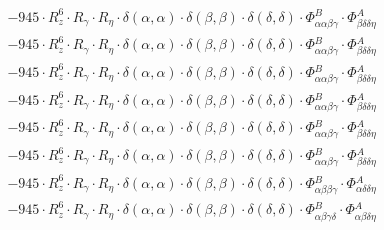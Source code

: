\documentclass{article}
\begin{document}
\begin{subequations}
\begin{gather}
\begin{array}{c}
 \\[0.2em] 		 - 945 \cdot R_{z}^{6} \cdot R_{\gamma{}} \cdot R_{\eta{}} \cdot \delta{}\left(\alpha{}, \alpha{}\right) \cdot \delta{}\left(\beta{}, \beta{}\right) \cdot \delta{}\left(\delta{}, \delta{}\right) \cdot \Phi{}^{B}_{\alpha{}\alpha{}\beta{}\gamma{}} \cdot \Phi{}^{A}_{\beta{}\delta{}\delta{}\eta{}} 
 \\[0.2em] 		 - 945 \cdot R_{z}^{6} \cdot R_{\gamma{}} \cdot R_{\eta{}} \cdot \delta{}\left(\alpha{}, \alpha{}\right) \cdot \delta{}\left(\beta{}, \beta{}\right) \cdot \delta{}\left(\delta{}, \delta{}\right) \cdot \Phi{}^{B}_{\alpha{}\alpha{}\beta{}\gamma{}} \cdot \Phi{}^{A}_{\beta{}\delta{}\delta{}\eta{}} 
 \\[0.2em] 		 - 945 \cdot R_{z}^{6} \cdot R_{\gamma{}} \cdot R_{\eta{}} \cdot \delta{}\left(\alpha{}, \alpha{}\right) \cdot \delta{}\left(\beta{}, \beta{}\right) \cdot \delta{}\left(\delta{}, \delta{}\right) \cdot \Phi{}^{B}_{\alpha{}\alpha{}\beta{}\gamma{}} \cdot \Phi{}^{A}_{\beta{}\delta{}\delta{}\eta{}} 
 \\[0.2em] 		 - 945 \cdot R_{z}^{6} \cdot R_{\gamma{}} \cdot R_{\eta{}} \cdot \delta{}\left(\alpha{}, \alpha{}\right) \cdot \delta{}\left(\beta{}, \beta{}\right) \cdot \delta{}\left(\delta{}, \delta{}\right) \cdot \Phi{}^{B}_{\alpha{}\alpha{}\beta{}\gamma{}} \cdot \Phi{}^{A}_{\beta{}\delta{}\delta{}\eta{}} 
 \\[0.2em] 		 - 945 \cdot R_{z}^{6} \cdot R_{\gamma{}} \cdot R_{\eta{}} \cdot \delta{}\left(\alpha{}, \alpha{}\right) \cdot \delta{}\left(\beta{}, \beta{}\right) \cdot \delta{}\left(\delta{}, \delta{}\right) \cdot \Phi{}^{B}_{\alpha{}\alpha{}\beta{}\gamma{}} \cdot \Phi{}^{A}_{\beta{}\delta{}\delta{}\eta{}} 
 \\[0.2em] 		 - 945 \cdot R_{z}^{6} \cdot R_{\gamma{}} \cdot R_{\eta{}} \cdot \delta{}\left(\alpha{}, \alpha{}\right) \cdot \delta{}\left(\beta{}, \beta{}\right) \cdot \delta{}\left(\delta{}, \delta{}\right) \cdot \Phi{}^{B}_{\alpha{}\alpha{}\beta{}\gamma{}} \cdot \Phi{}^{A}_{\beta{}\delta{}\delta{}\eta{}} 
 \\[0.2em] 		 - 945 \cdot R_{z}^{6} \cdot R_{\gamma{}} \cdot R_{\eta{}} \cdot \delta{}\left(\alpha{}, \alpha{}\right) \cdot \delta{}\left(\beta{}, \beta{}\right) \cdot \delta{}\left(\delta{}, \delta{}\right) \cdot \Phi{}^{B}_{\alpha{}\beta{}\beta{}\gamma{}} \cdot \Phi{}^{A}_{\alpha{}\delta{}\delta{}\eta{}} 
 \\[0.2em] 		 - 945 \cdot R_{z}^{6} \cdot R_{\gamma{}} \cdot R_{\eta{}} \cdot \delta{}\left(\alpha{}, \alpha{}\right) \cdot \delta{}\left(\beta{}, \beta{}\right) \cdot \delta{}\left(\delta{}, \delta{}\right) \cdot \Phi{}^{B}_{\alpha{}\beta{}\gamma{}\delta{}} \cdot \Phi{}^{A}_{\alpha{}\beta{}\delta{}\eta{}} 

\end{array}
\end{gather}
\end{subequations}
\end{document}
